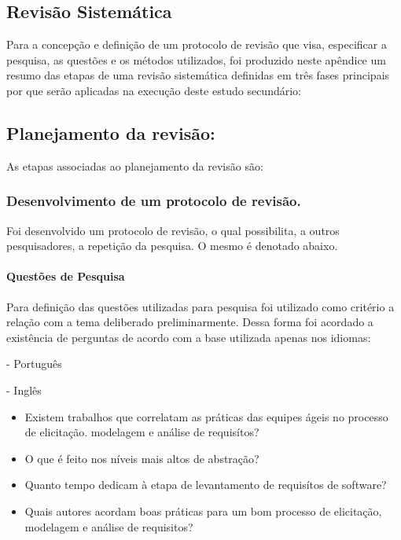 \begin{apendicesenv}
\partapendices
\chapter[Revisão Sistemática]{Revisão Sistemática}
Para a concepção e definição de um protocolo de revisão que visa, especificar a pesquisa, as questões e os métodos utilizados, foi produzido neste apêndice um resumo das etapas de uma revisão sistemática definidas em três fases principais por \cite{kitchenham2004procedures} que serão aplicadas na execução deste estudo secundário: 

\hypertarget{A}{}
\section{\textbf{Planejamento da revisão:}}
As etapas associadas ao planejamento da revisão são:

\subsection{Desenvolvimento de um protocolo de revisão.}
Foi desenvolvido um protocolo de revisão, o qual possibilita, a outros pesquisadores, a repetição da pesquisa. O mesmo é denotado abaixo.

\subsubsection{Questões de Pesquisa}
Para definição das questões utilizadas para pesquisa foi utilizado como critério a relação com a tema deliberado preliminarmente. Dessa forma foi acordado a existência de perguntas de acordo com a base utilizada apenas nos idiomas: 

- Português

- Inglês 

\begin{itemize}
    \item Existem trabalhos que correlatam as práticas das equipes ágeis no processo de elicitação. modelagem e análise de requisítos? 

    \item O que é feito nos níveis mais altos de abstração?

    \item Quanto tempo dedicam à etapa de levantamento de requisítos de software?

    \item Quais autores acordam boas práticas para um bom processo de elicitação, modelagem e análise de requisitos?


\end{itemize}
\end{apendicesenv}
